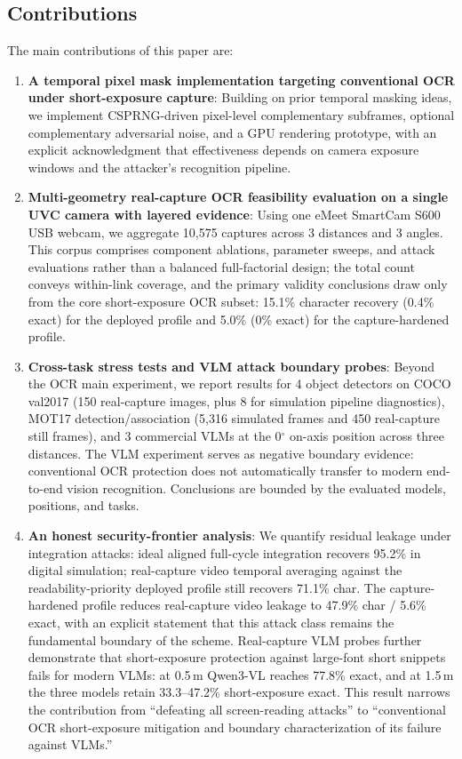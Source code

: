 \documentclass{ieeeaccess}
\begin{document}
\subsection{Contributions}

The main contributions of this paper are:
\begin{enumerate}
\item \textbf{A temporal pixel mask implementation targeting conventional OCR under short-exposure capture}: Building on prior temporal masking ideas, we implement CSPRNG-driven pixel-level complementary subframes, optional complementary adversarial noise, and a GPU rendering prototype, with an explicit acknowledgment that effectiveness depends on camera exposure windows and the attacker's recognition pipeline.

\item \textbf{Multi-geometry real-capture OCR feasibility evaluation on a single UVC camera with layered evidence}: Using one eMeet SmartCam S600 USB webcam, we aggregate 10,575 captures across 3 distances and 3 angles. This corpus comprises component ablations, parameter sweeps, and attack evaluations rather than a balanced full-factorial design; the total count conveys within-link coverage, and the primary validity conclusions draw only from the core short-exposure OCR subset: 15.1\% character recovery (0.4\% exact) for the deployed profile and 5.0\% (0\% exact) for the capture-hardened profile.

\item \textbf{Cross-task stress tests and VLM attack boundary probes}: Beyond the OCR main experiment, we report results for 4 object detectors on COCO val2017 (150 real-capture images, plus 8 for simulation pipeline diagnostics), MOT17 detection/association (5,316 simulated frames and 450 real-capture still frames), and 3 commercial VLMs at the 0$^{\circ}$ on-axis position across three distances. The VLM experiment serves as negative boundary evidence: conventional OCR protection does not automatically transfer to modern end-to-end vision recognition. Conclusions are bounded by the evaluated models, positions, and tasks.

\item \textbf{An honest security-frontier analysis}: We quantify residual leakage under integration attacks: ideal aligned full-cycle integration recovers 95.2\% in digital simulation; real-capture video temporal averaging against the readability-priority deployed profile still recovers 71.1\% char. The capture-hardened profile reduces real-capture video leakage to 47.9\% char / 5.6\% exact, with an explicit statement that this attack class remains the fundamental boundary of the scheme. Real-capture VLM probes further demonstrate that short-exposure protection against large-font short snippets fails for modern VLMs: at 0.5\,m Qwen3-VL reaches 77.8\% exact, and at 1.5\,m the three models retain 33.3--47.2\% short-exposure exact. This result narrows the contribution from ``defeating all screen-reading attacks'' to ``conventional OCR short-exposure mitigation and boundary characterization of its failure against VLMs.''


\end{enumerate}
\end{document}
